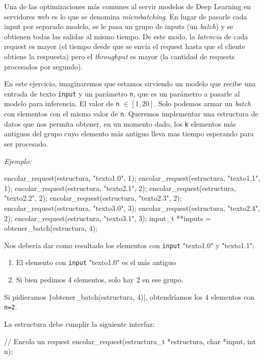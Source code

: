 \documentclass[titlepage,oneside]{book}
\begin{document}
\begin{Exercise}[difficulty=1]
	Una de las optimizaciones más comunes al servir modelos de Deep Learning en servidores web es lo que se denomina \textit{microbatching}. En lugar de pasarle cada input por separado modelo, se le pasa un grupo de inputs (un \textit{batch}) y se obtienen todas las salidas al mismo tiempo. De este modo, la \textit{latencia} de cada request es mayor (el tiempo desde que se envía el request hasta que el cliente obtiene la respuesta) pero el \textit{throughput} es mayor (la cantidad de requests procesados por segundo).

	En este ejercicio, imaginaremos que estamos sirviendo un modelo que recibe una entrada de texto \texttt{input} y un parámetro \texttt{n}, que es un parámetro a pasarle al modelo para inferencia. El valor de \texttt{n} $\in \left[1, 20\right]$. Solo podemos armar un \textit{batch} con elementos con el mismo valor de \texttt{n}. Queremos implementar una estructura de datos que nos permita obtener, en un momento dado, los \texttt{k} elementos más antiguos del grupo cuyo elemento más antiguo lleva mas tiempo esperando para ser procesado.

	\textit{Ejemplo:}\\

    \begin{ccode}
    encolar_request(estructura, "texto1.0", 1);
	encolar_request(estructura, "texto1.1", 1);
	encolar_request(estructura, "texto2.1", 2);
	encolar_request(estructura, "texto2.2", 2);
	encolar_request(estructura, "texto2.3", 2);
	encolar_request(estructura, "texto3.0", 3);
	encolar_request(estructura, "texto2.4", 2);
	encolar_request(estructura, "texto3.1", 3);
	input_t **inputs = obtener_batch(estructura, 4);
	\end{ccode}

	Nos debería dar como resultado los elementos con \texttt{input} "texto1.0" y "texto1.1":
	\begin{enumerate}
		\item El elemento con \texttt{input} "texto1.0" es el más antiguo
		\item Si bien pedimos 4 elementos, solo hay 2 en ese grupo.
	\end{enumerate}

	Si pidieramos \texttt|obtener_batch(estructura, 4)|, obtendríamos los $4$ elementos con \texttt{n=2}.

	La estructura debe cumplir la siguiente interfaz:
    \begin{ccode}
		// Encola un request
		encolar_request(estructura_t *estructura, char *input, int n);


\end{ccode}
\end{Exercise}
\end{document}

